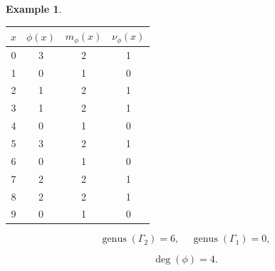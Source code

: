 \documentclass[12pt,letterpaper]{article}
\theoremstyle{definition}
\newtheorem{example}[theorem]{Example}
\DeclareMathOperator{\genus}{genus}
\begin{document}
\begin{example}
{\begin{center}
\begin{tabular}{c|c|c|c}  
  $x$ & $\phi(x)$ & $m_\phi(x)$ & $\nu_\phi(x)$ \\ \hline
  0   &    3   &        2         &  1   \\ 
  1   &    0   &        1         &  0   \\ 
  2   &    1   &        2         &  1   \\ 
  3   &    1   &        2         &  1   \\ 
  4   &    0   &        1         &  0   \\ 
  5   &    3   &        2         &  1    \\ 
  6   &    0   &        1         &  0   \\ 
  7   &    2   &        2         &  1   \\
  8   &    2   &        2         &  1   \\
  9   &    0   &        1         &  0   \\ 
\end{tabular}
\end{center}

\[
  \genus(\Gamma_2) =6,\ \ \ \ \
  \genus(\Gamma_1) =0,
\]

\[
\deg(\phi) =4.
\]


}
\end{example}
\end{document}
